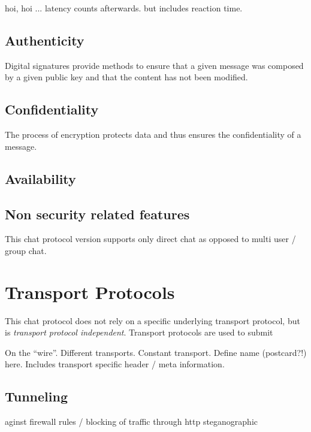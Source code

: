 hoi, hoi ... latency counts afterwards. but includes reaction time.

\subsection{Authenticity}
Digital signatures provide methods to ensure that a given message
was composed by a given public key and that the content has not been
modified.
\subsection{Confidentiality}
The process of encryption protects data and thus ensures the
confidentiality of a message.
\subsection{Availability}
\subsection{Non security related features}
This chat protocol version supports only direct chat as opposed to
multi user / group chat.

\section{Transport Protocols}
This chat protocol does not rely on a specific underlying transport protocol,
but is \textit{transport protocol independent}. Transport protocols are used
to submit 


On the "`wire"'. Different transports. Constant transport.
Define name (postcard?!) here. Includes transport specific
header / meta information.

\subsection{Tunneling}
aginst firewall rules / blocking of traffic
through http
steganographic

